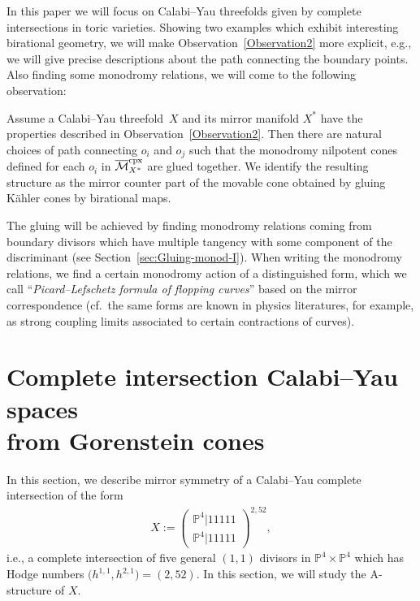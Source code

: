 \documentclass[10pt,a4paper]{amsart}
\numberwithin{equation}{section}
\begin{document}
In this paper we will focus on Calabi--Yau threefolds given by complete intersections in toric varieties. Showing two examples which exhibit interesting birational geometry, we will make Observation~\ref{Observation2} more explicit, e.g., we will give precise descriptions about the path connecting the boundary points. Also finding some monodromy relations, we will come to the following observation:

\begin{Main} Assume a Calabi--Yau threefold~$X$ and its mirror manifold $X^{*}$ have the properties described in Observation~\ref{Observation2}. Then there are natural choices of path connecting $o_{i}$ and $o_{j}$ such that the monodromy nilpotent cones defined for each $o_{i}$ in $\overline{\mathcal{M}}_{X^{*}}^{\rm cpx}$ are glued together. We identify the resulting structure as the mirror counter part of the movable cone obtained by gluing K\"ahler cones by birational maps.
\end{Main}

The gluing will be achieved by finding monodromy relations coming from boundary divisors which have multiple tangency with some component of the discriminant (see Section~\ref{sec:Gluing-monod-I}). When writing the monodromy relations, we find a certain monodromy action of a distinguished form, which we call ``\textit{Picard--Lefschetz formula of flopping curves}'' based on the mirror correspondence (cf.\ the same forms are known in physics literatures, \cite{A-Scheideg, CandelasTwoI} for example, as strong coupling limits associated to certain contractions of curves).

\section[Complete intersection Calabi--Yau spaces from Gorenstein cones]{Complete intersection Calabi--Yau spaces\\ from Gorenstein cones}\label{sec: CICY-I}

In this section, we describe mirror symmetry of a Calabi--Yau complete intersection of the form
\begin{gather}
 X:=\left(\begin{matrix}\mathbb{P}^{4}|11111\\
\mathbb{P}^{4}|11111
\end{matrix}\right)^{2,52},\label{eq:XP4P4}
\end{gather}
i.e., a complete intersection of five general $(1,1)$ divisors in $\mathbb{P}^{4}\times\mathbb{P}^{4}$ which has Hodge numbers $\big(h^{1,1},h^{2,1}\big)=(2,52)$. In this section, we will study the A-structure of $X$.
\end{document}
